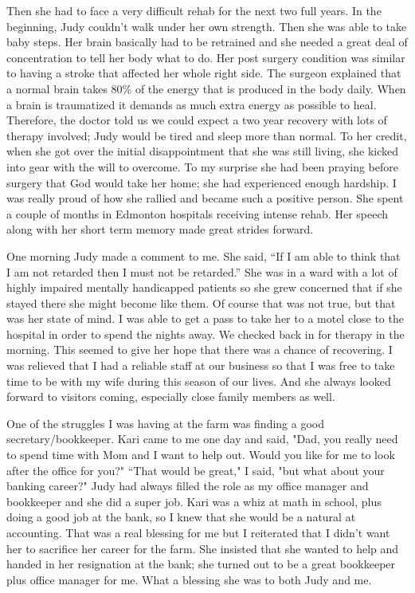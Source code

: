 \documentclass[twoside, 12pt]{book}
\begin{document}
Then she had to face a very difficult rehab for the next two full years. In the beginning, Judy couldn't walk under her own strength. Then she was able to take baby steps. Her brain basically had to be retrained and she needed a great deal of concentration to tell her body what to do. Her post surgery condition was similar to having a stroke that affected her whole right side. The surgeon explained that a normal brain takes 80\% of the energy that is produced in the body daily. When a brain is traumatized it demands as much extra energy as possible to heal. Therefore, the doctor told us we could expect a two year recovery with lots of therapy involved; Judy would be tired and sleep more than normal. To her credit, when she got over the initial disappointment that she was still living, she kicked into gear with the will to overcome. To my surprise she had been praying before surgery that God would take her home; she had experienced enough hardship. I was really proud of how she rallied and became such a positive person. She spent a couple of months in Edmonton hospitals receiving intense rehab. Her speech along with her short term memory made great strides forward. 

One morning Judy made a comment to me. She said, “If I am able to think that I am not retarded then I must not be retarded.” She was in a ward with a lot of highly impaired mentally handicapped patients so she grew concerned that if she stayed there she might become like them. Of course that was not true, but that was her state of mind. I was able to get a pass to take her to a motel close to the hospital in order to spend the nights away.  We checked back in for therapy in the morning. This seemed to give her hope that there was a chance of recovering. I was relieved that I had a reliable staff at our business so that I was free to take time to be with my wife during this season of our lives. And she always looked forward to visitors coming, especially close family members as well.

One of the struggles I was having at the farm was finding a good secretary/bookkeeper. Kari came to me one day and said, "Dad, you really need to spend time with Mom and I want to help out. Would you like for me to look after the office for you?" “That would be great," I said, "but what about your banking career?" Judy had always filled the role as my office manager and bookkeeper and she did a super job. Kari was a whiz at math in school, plus doing a good job at the bank, so I knew that she would be a natural at accounting. That was a real blessing for me but I reiterated that I didn't want her to sacrifice her career for the farm. She insisted that she wanted to help and handed in her resignation at the bank; she turned out to be a great bookkeeper plus office manager for me. What a blessing she was to both Judy and me.
\end{document}
